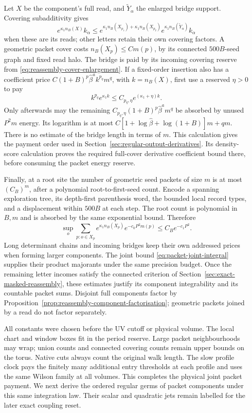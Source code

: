 \documentclass[11pt,reqno]{amsart}
\numberwithin{equation}{section}
\theoremstyle{definition}
\theoremstyle{remark}
\begin{document}
Let \(X\) be the component's full read, and
\(\widetilde Y_\alpha\) the enlarged bridge support.
Covering subadditivity gives
\[
 e^{\kappa_1 n_B(X)}k_\alpha
 \le e^{\kappa_1 n_B(X_{p_1})+\kappa_1 n_B(X_{p_2})}
                         e^{\kappa_1 n_B(\widetilde Y_\alpha)}k_\alpha
\]
when these are its reads; other letters retain their own
covering factors. A geometric packet cover costs
\(n_B(X_p)\le Cm(p)\), by its connected \(500B\)-seed
graph and fixed read halo. The bridge is paid by its incoming
covering reserve from \eqref{eq:reassembly-cover-enlargement}.
If a fixed-order insertion also has a coefficient price
\(C(1+B)^p\widehat\beta^a k^{p_q}m^q\), with
\(k=n_B(X)\), first use a reserved \(\eta>0\) to pay
\[
       k^{p_q}e^{\kappa_1k}\le
                  C_{p_q,\eta}e^{(\kappa_1+\eta)k}.
\]
Only afterwards may the remaining
\(C_{p_q,\eta}(1+B)^p\widehat\beta^am^q\) be absorbed by
unused \(P^2m\) energy. Its logarithm is at most
\(C[1+\log\widehat\beta+\log(1+B)]m+qm\).
There is no estimate of the bridge length in terms of \(m\).
This calculation gives the payment order used in
Section~\ref{sec:regular-output-derivatives}. Its density-score
calculation proves the required full-cover derivative coefficient
bound there, before consuming the packet energy reserve.

Finally, at a root site the number of geometric seed packets
of size \(m\) is at most \((C_B)^m\), after a polynomial
root-to-first-seed count. Encode a spanning exploration tree,
its depth-first parenthesis word, the bounded local record
types, and a displacement within \(500B\) at each step.
The root count is polynomial in \(B,m\) and is absorbed by
the same exponential bound. Therefore
\begin{equation}
 \sup_o\sum_{p:o\in X_p}e^{\kappa_1 n_B(X_p)}
                      e^{-c_0P^2m(p)}\le C_Be^{-c_1P^2}.
 \label{eq:packet-covering-income}
\end{equation}
Long determinant chains and incoming bridges keep their own
addressed prices when forming larger components. The joint
bound \eqref{eq:packet-joint-integral} supplies their product
majorants under the same precision budget. Once the remaining
letter incomes satisfy the connected criterion of
Section~\ref{sec:exact-masked-reassembly}, these estimates
justify its component integrability and its countable packet
sums. Disjoint full components factor by
Proposition~\ref{prop:reassembly-component-factorisation};
geometric packets joined by a read do not factor separately.

All constants were chosen before the UV cutoff or physical
volume. The local chart and window boxes fit in the period
reserve. Large packet neighbourhoods may wrap; union counts
and connected covering counts remain upper bounds on the torus.
Native cuts always count the original walk length. The slow
profile clock pays the finitely many additional entry thresholds
at each profile and uses the same Wilson family at all volumes.
This completes the physical joint packet payment. We next
derive the ordered regular germs of packet components under
this same integration law. Their scalar and quadratic jets
remain labelled for the later exact coupling reset.
\end{document}
